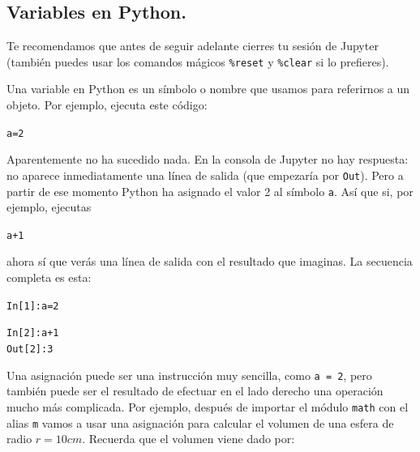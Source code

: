 \documentclass[10pt,a4paper]{article}\usepackage[]{graphicx}\usepackage[]{color}
\makeatletter
\newcommand{\hlnum}[1]{\textcolor[rgb]{0.686,0.059,0.569}{#1}}%
\newcommand{\hlopt}[1]{\textcolor[rgb]{0,0,0}{#1}}%
\newcommand{\hlstd}[1]{\textcolor[rgb]{0.345,0.345,0.345}{#1}}%
\newcommand{\hlkwb}[1]{\textcolor[rgb]{0.69,0.353,0.396}{#1}}%
\newenvironment{kframe}{%
 \def\at@end@of@kframe{}%
 \ifinner\ifhmode%
  \def\at@end@of@kframe{\end{minipage}}%
  \begin{minipage}{\columnwidth}%
 \fi\fi%
 \def\FrameCommand##1{\hskip\@totalleftmargin \hskip-\fboxsep
 \colorbox{shadecolor}{##1}\hskip-\fboxsep
     \hskip-\linewidth \hskip-\@totalleftmargin \hskip\columnwidth}%
 \MakeFramed {\advance\hsize-\width
   \@totalleftmargin\z@ \linewidth\hsize
   \@setminipage}}%
 {\par\unskip\endMakeFramed%
 \at@end@of@kframe}
\newenvironment{knitrout}{}{} %
\makeatother
\begin{document}
\subsection{Variables en Python.}
\label{tut02:subsec:variablesPython}

Te recomendamos que antes de seguir adelante cierres tu sesión de Jupyter (también puedes usar los comandos mágicos \verb#%reset# y \verb#%clear# si lo prefieres).

Una {\sf variable} en Python es un símbolo o nombre que usamos para referirnos a un objeto. Por ejemplo, ejecuta este código:
\begin{knitrout}
\color{fgcolor}\begin{kframe}
\begin{alltt}
\hlstd{a} \hlkwb{=} \hlnum{2}
\end{alltt}
\end{kframe}
\end{knitrout}
Aparentemente no ha sucedido nada. En la consola de Jupyter no hay respuesta: no aparece inmediatamente una línea de salida (que empezaría por {\tt Out}). Pero a partir de ese momento Python ha {\sf asignado} el valor 2 al símbolo {\tt a}. Así que si, por ejemplo, ejecutas
\begin{knitrout}
\color{fgcolor}\begin{kframe}
\begin{alltt}
\hlstd{a} \hlopt{+} \hlnum{1}
\end{alltt}
\end{kframe}
\end{knitrout}
ahora sí que verás una línea de salida con el resultado que imaginas. La secuencia completa es esta:
\begin{knitrout}
\color{fgcolor}\begin{kframe}
\begin{alltt}
\hlstd{In [}\hlnum{1}\hlstd{]}\hlopt{:} \hlstd{a} \hlkwb{=} \hlnum{2}

\hlstd{In [}\hlnum{2}\hlstd{]}\hlopt{:} \hlstd{a} \hlopt{+} \hlnum{1}
\hlstd{Out[}\hlnum{2}\hlstd{]}\hlopt{:} \hlnum{3}
\end{alltt}
\end{kframe}
\end{knitrout}
Una {\sf asignación} puede ser una instrucción muy sencilla, como {\tt a = 2}, pero también puede ser el resultado de efectuar en el lado derecho una operación mucho más complicada. Por ejemplo, después de importar el módulo {\tt math} con el alias {\tt m} vamos a usar una asignación para calcular el volumen de una esfera de radio $r=10cm$. Recuerda que el volumen viene dado por:
\end{document}
